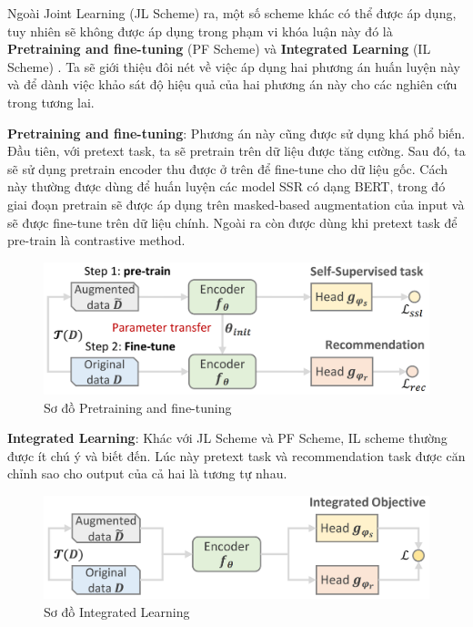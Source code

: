 
Ngoài Joint Learning (JL Scheme) ra, một số scheme khác có thể được áp dụng, tuy nhiên sẽ không được áp dụng trong phạm vi khóa luận này đó là \textbf{Pretraining and fine-tuning} (PF Scheme) và \textbf{Integrated Learning} (IL Scheme) \cite{survey:ssl-for-rec-sys}. Ta sẽ giới thiệu đôi nét về việc áp dụng hai phương án huấn luyện này và để dành việc khảo sát độ hiệu quả của hai phương án này cho các nghiên cứu trong tương lai.

\textbf{Pretraining and fine-tuning}: Phương án này cũng được sử dụng khá phổ biến. Đầu tiên, với pretext task, ta sẽ pretrain trên dữ liệu được tăng cường. Sau đó, ta sẽ sử dụng pretrain encoder thu được ở trên để fine-tune cho dữ liệu gốc. Cách này thường được dùng để huấn luyện các model SSR có dạng BERT, trong đó giai đoạn pretrain sẽ được áp dụng trên masked-based augmentation của input và sẽ được fine-tune trên dữ liệu chính. Ngoài ra còn được dùng khi pretext task để pre-train là contrastive method.
\begin{figure}[H]
    \centering
    \includegraphics[scale=0.32]{images/Chapter3/pf_scheme.png}
    \caption{Sơ đồ Pretraining and fine-tuning}
\end{figure}

\textbf{Integrated Learning}: Khác với JL Scheme và PF Scheme, IL scheme thường được ít chú ý và biết đến. Lúc này pretext task và recommendation task được căn chỉnh sao cho output của cả hai là tương tự nhau.
\begin{figure}[H]
    \centering
    \includegraphics[scale=0.32]{images/Chapter3/il_scheme.png}
    \caption{Sơ đồ Integrated Learning}
\end{figure}

